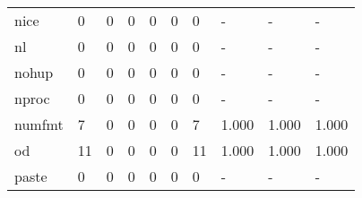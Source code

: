 \begin{longtable}{lp{2.0cm}p{2.0cm}p{2.0cm}p{2.0cm}p{2.0cm}p{2.0cm}p{2.0cm}p{2.0cm}p{2.0cm}}
nice      &                      0 &                                             0 &                                            0 &                                           0 &                                            0 &                                          0 &                                    - &                                      - &                                    - \\
nl        &                      0 &                                             0 &                                            0 &                                           0 &                                            0 &                                          0 &                                    - &                                      - &                                    - \\
nohup     &                      0 &                                             0 &                                            0 &                                           0 &                                            0 &                                          0 &                                    - &                                      - &                                    - \\
nproc     &                      0 &                                             0 &                                            0 &                                           0 &                                            0 &                                          0 &                                    - &                                      - &                                    - \\
numfmt    &                      7 &                                             0 &                                            0 &                                           0 &                                            0 &                                          7 &                                1.000 &                                  1.000 &                                1.000 \\
od        &                     11 &                                             0 &                                            0 &                                           0 &                                            0 &                                         11 &                                1.000 &                                  1.000 &                                1.000 \\
paste     &                      0 &                                             0 &                                            0 &                                           0 &                                            0 &                                          0 &                                    - &                                      - &                                    - \\

\end{longtable}
